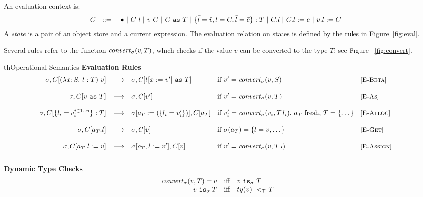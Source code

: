 \documentclass{article}
\newcommand{\fun}[1]{\mbox{\it #1\/}}
\newcommand{\lam}[4]{\lambda#1\!:\!#2.\,\,#4:#3}
\newcommand{\app}[2]{#1~#2}
\newcommand{\hole}{\bullet}
\newcommand{\App}[2]{#1[#2]}
\newcommand{\cast}[2]{#1~\t{as}~#2}
\newcommand{\subtypeword}[1]{\,\,<\!\!\!{\tiny{#1}}\,\,}
\renewcommand{\subtypeword}[1]{\,\,<\!\!_{\tiny{#1}}\,\,}
\newcommand{\subtype}[2]{#1 \subtypeword{\top} #2}
\newcommand{\convert}[2]{{#1}\convertword{#2}}
\newcommand{\convertword}{\mbox{\,\,$\sim :$\,\,}}
\renewcommand{\t}[1]{{\tt #1}}
\newcommand{\red}[0]{\longrightarrow}  %
\newcommand{\lred}[0]{\red}  %
\newcommand{\objty}[1]{\{#1\}}
\newcommand{\obje}[2]{\{#1\}:{#2}}
\newcommand{\objv}[1]{\{#1\}}
\newcommand{\objget}[2]{#1.#2}
\newcommand{\objcall}[2]{#1.#2()}
\newcommand{\objset}[3]{#1.#2:=#3}
\newcommand{\wrap}[2]{#1~\t{wrap}~#2}
\newcommand{\allocty}[1]{ty(#1)}
\renewcommand{\convert}[2]{\fun{convert}_{\sigma}(#1,#2)}
\newcommand{\istype}[2]{#1~\t{is}_{\sigma}~ #2}
\begin{document}
An evaluation context is:
\[
C ~~::=
\begin{array}[t]{@{}l}
		~~~\hole
	~|~	\app{C}{t} 
	~|~	\app{v}{C}
	~|~ \cast{C}{T} 
	~|~ \obje{\bar l=\bar v,l=C, \bar l =\bar e}{T}
	~|~ \objget{C}{l}
	~|~ \objset{C}{l}{e}
	~|~ \objset{v}{l}{C} 
\end{array}
\]
A \emph{state} is a pair of an object store and a current expression.
The evaluation relation on states is defined by the rules in Figure~\ref{fig:eval}.

Several rules refer to the function $\convert{v}{T}$, which checks if the value $v$ can be converted to the type $T$: 
see  Figure ~\ref{fig:convert}.  

\begin{displayfigure}{th}{Operational Semantics}
\label{fig:eval} 
\label{fig:convert} 
\footnotesize
{\bf Evaluation Rules}
\[
\begin{array}{@{}rclll}
	\sigma,C[{\app{(\lam{x}{S}{T}{t})}{v}}]
	&\lred&
	\sigma,C[\cast{t[x:=v']}{T}]
	&\mbox{if $v'=\convert v S$}
	&\rel{E-Beta}
\\~\\
	\sigma,C[\cast{v}{T}]
	&\lred&
	\sigma,C[v']
	&\mbox{if $v'=\convert v T$}
	&\rel{E-As}
\\~\\
	\sigma,C[\obje{l_i=v_i^{i\in 1..n}}{T}]
	&\lred&
	\sigma[a_T:=(\objv{l_i=v'_i})],C[a_T] 
	&\mbox{if $v_i'=\convert{v_i}{T.l_i}$, $a_T$ fresh, $T=\objty{\dots}$}
	&\rel{E-Alloc} 
\\~\\
	\sigma,C[\objget{a_T}{l}]
	&\lred&
	\sigma,C[v]
	&\mbox{if $\sigma(a_T)=\objv{l=v,\dots}$}
	&\rel{E-Get}
\\~\\
	\sigma,C[\objset{a_T}{l}{v}]
	&\lred&
	\sigma[a_T,l:=v'],C[v] 
	&\mbox{if $v'=\convert v {T.l}$}
	&\rel{E-Assign} 
\\~\\
\end{array}
\]
{\bf Dynamic Type Checks}
\[
\begin{array}{rcl}
	\convert{v}{T} = v &\mbox{iff}&\mbox{$\istype v T$} \\
	\istype{v}{T}      &\mbox{iff}& \mbox{$\subtype{\allocty v}{T}$} \\
\end{array}
\]
 \end{displayfigure} 
\end{document}
